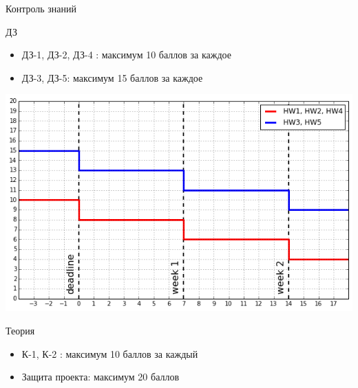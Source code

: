 \documentclass[10pt]{beamer}
\begin{document}
\begin{frame}{Контроль знаний}

\begin{block}{ДЗ}
\begin{itemize}
\item ДЗ-1, ДЗ-2, ДЗ-4 : максимум 10 баллов за каждое
\item ДЗ-3, ДЗ-5: максимум 15 баллов за каждое
\end{itemize}
\end{block}

\begin{center}
\includegraphics[scale=0.28]{images/hw.png}
\end{center}

\begin{alertblock}{Теория}
\begin{itemize}
\item К-1, К-2 : максимум 10 баллов за каждый
\item Защита проекта: максимум 20 баллов
\end{itemize}
\end{alertblock}

\end{frame}
\end{document}
